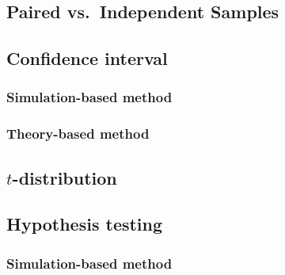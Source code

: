 \documentclass[
]{report}
\begin{document}
\hypertarget{paired-vs.-independent-samples}{%
\subsection*{Paired vs.~Independent Samples}\label{paired-vs.-independent-samples}}

\hypertarget{confidence-interval-4}{%
\subsection*{Confidence interval}\label{confidence-interval-4}}

\hypertarget{simulation-based-method-4}{%
\subsubsection*{Simulation-based method}\label{simulation-based-method-4}}

\hypertarget{theory-based-method-1}{%
\subsubsection*{Theory-based method}\label{theory-based-method-1}}

\hypertarget{t-distribution}{%
\subsection*{\texorpdfstring{\(t\)-distribution}{t-distribution}}\label{t-distribution}}

\hypertarget{hypothesis-testing-3}{%
\subsection*{Hypothesis testing}\label{hypothesis-testing-3}}

\hypertarget{simulation-based-method-5}{%
\subsubsection*{Simulation-based method}\label{simulation-based-method-5}}
\end{document}
